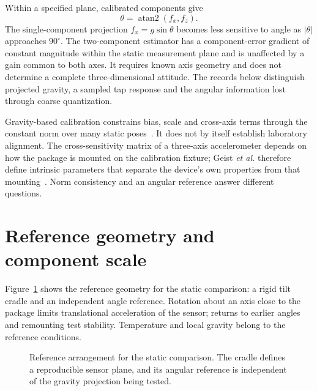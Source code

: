Within a specified plane, calibrated components give
\begin{equation}
 \theta=\operatorname{atan2}(f_x,f_z).
 \label{eq:accel-angle}
\end{equation}
The single-component projection $f_x=g\sin\theta$ becomes less sensitive to angle as $|\theta|$ approaches $90^\circ$. The two-component estimator has a component-error gradient of constant magnitude within the static measurement plane and is unaffected by a gain common to both axes. It requires known axis geometry and does not determine a complete three-dimensional attitude. The records below distinguish projected gravity, a sampled tap response and the angular information lost through coarse quantization.

Gravity-based calibration constrains bias, scale and cross-axis terms through the constant norm over many static poses~\cite{frosio2009}. It does not by itself establish laboratory alignment. The cross-sensitivity matrix of a three-axis accelerometer depends on how the package is mounted on the calibration fixture; Geist \emph{et al.} therefore define intrinsic parameters that separate the device's own properties from that mounting~\cite{geist2017}. Norm consistency and an angular reference answer different questions.

\section{Reference geometry and component scale}
Figure~\ref{fig:accel-apparatus} shows the reference geometry for the static comparison: a rigid tilt cradle and an independent angle reference. Rotation about an axis close to the package limits translational acceleration of the sensor; returns to earlier angles and remounting test stability. Temperature and local gravity belong to the reference conditions.

\begin{figure}[t]
\centering
{}
\caption{Reference arrangement for the static comparison. The cradle defines a reproducible sensor plane, and its angular reference is independent of the gravity projection being tested.}
\label{fig:accel-apparatus}
\end{figure}

